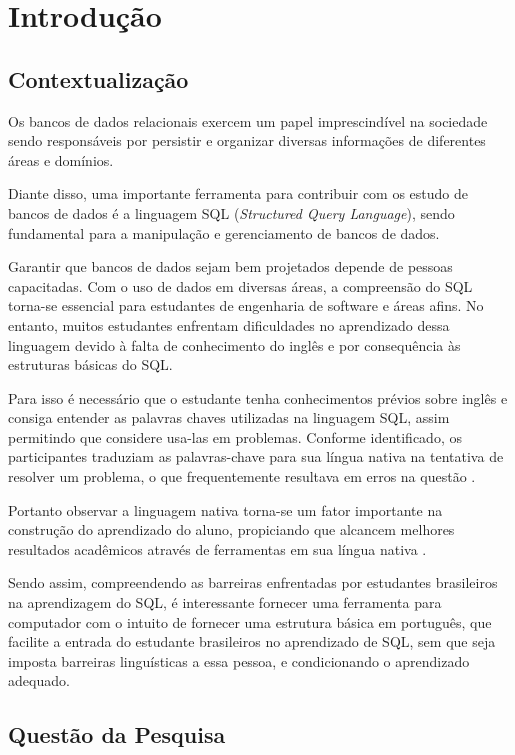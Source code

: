 
\chapter[Introdução]{Introdução}
\label{sec:Introducao}

\section{Contextualização}

Os bancos de dados relacionais exercem um papel imprescindível na sociedade sendo responsáveis por persistir e organizar diversas informações de diferentes áreas e domínios.

Diante disso, uma importante ferramenta para contribuir com os estudo de bancos de dados é a linguagem SQL (\textit{Structured Query Language}), sendo fundamental para a manipulação e gerenciamento de bancos de dados.

Garantir que bancos de dados sejam bem projetados depende de pessoas capacitadas. Com o uso de dados em diversas áreas, a compreensão do SQL torna-se essencial para estudantes de engenharia de software e áreas afins. No entanto, muitos estudantes enfrentam dificuldades no aprendizado dessa linguagem devido à falta de conhecimento do inglês e por consequência às estruturas básicas do SQL.

Para isso é necessário que o estudante tenha conhecimentos prévios sobre inglês e consiga entender as palavras chaves utilizadas na linguagem SQL, assim permitindo que considere usa-las em problemas. Conforme identificado, os participantes traduziam as palavras-chave para sua língua nativa na tentativa de resolver um problema, o que frequentemente resultava em erros na questão \cite{Miedema2021}.

Portanto observar a linguagem nativa torna-se um fator importante na construção do aprendizado do aluno, propiciando que alcancem melhores resultados acadêmicos através de ferramentas em sua língua nativa \cite{Silva2020}.

Sendo assim, compreendendo as barreiras enfrentadas por estudantes brasileiros na aprendizagem do SQL, é interessante fornecer uma ferramenta para computador com o intuito de fornecer uma estrutura básica em português, que facilite a entrada do estudante brasileiros no aprendizado de SQL, sem que seja imposta barreiras linguísticas a essa pessoa, e condicionando o aprendizado adequado.


\section{Questão da Pesquisa}

